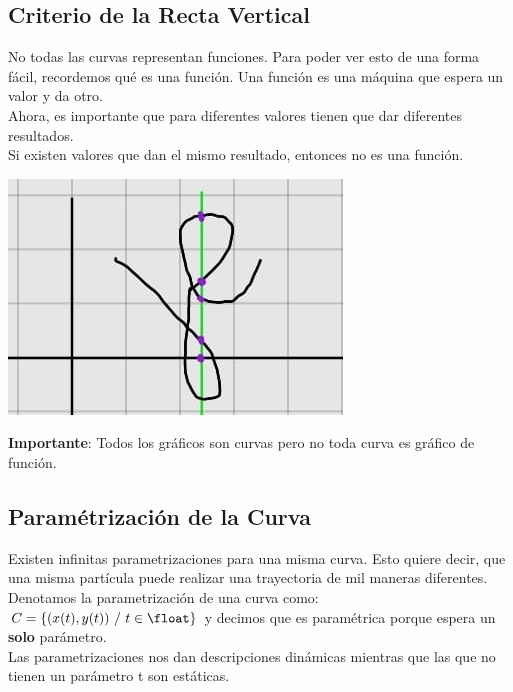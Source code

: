\documentclass[10pt,a4paper]{article}
\begin{document}
\subsection*{Criterio de la Recta Vertical}
No todas las curvas representan funciones. Para poder ver esto de una forma fácil, recordemos qué es una función. Una función es una máquina que espera un valor y da otro. \\
Ahora, es importante que para diferentes valores tienen que dar diferentes resultados. \\
Si existen valores que dan el mismo resultado, entonces no es una función. 
\begin{center}
    \begin{minipage}[b]{0.3\textwidth}
        \includegraphics[width=\linewidth]{assets/criterio_recta_vertical.jpg}
        \centering
        \label{fig:criterio_recta_vertical}
    \end{minipage}
\end{center}
\textbf{Importante}: Todos los gráficos son curvas pero no toda curva es gráfico de función.
\subsection*{Paramétrización de la Curva}
Existen infinitas parametrizaciones para una misma curva. Esto quiere decir, que una misma partícula puede realizar una trayectoria de mil maneras diferentes. \\
Denotamos la parametrización de una curva como: $C = \{(x(t), y(t)) \ / \ t \in \float \}$ y decimos que es paramétrica porque espera un \textbf{solo} parámetro. \\
Las parametrizaciones nos dan descripciones dinámicas mientras que las que no tienen un parámetro t son estáticas.
\end{document}
